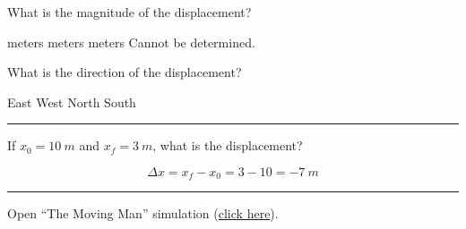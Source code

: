 \documentclass[answers]{exam}
\begin{document}
\begin{questions}
\begin{questions}
\question
What is the magnitude of the displacement?

\begin{choices}
 meters
 meters
 meters
\choice Cannot be determined.
\end{choices}

\question \label{ques:Skier_end}
What is the direction of the displacement?

\begin{choices}
\choice East
\CorrectChoice West
\choice North   
\choice South
\end{choices}

\vspace{1em} \hrule

\question
If $x_0 = \SI{10}{m}$ and $x_f = \SI{3}{m}$, what is the displacement?

\begin{solution}
\begin{equation*}
    \Delta{x} = x_f - x_0 = 3 - 10 = \SI{-7}{m} 
\end{equation*}
\end{solution}


\vspace{1em}
\hrule

\question
Open ``The Moving Man'' simulation (\href{https://archive.cnx.org/specials/e2ca52af-8c6b-450e-ac2f-9300b38e8739/moving-man/}{click here}). 

\end{questions}
\end{questions}
\end{document}
